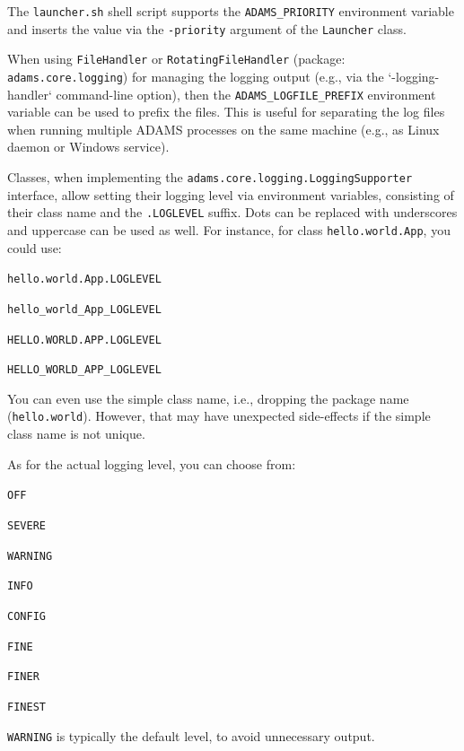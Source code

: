 \noindent The \texttt{launcher.sh} shell script supports the \texttt{ADAMS\_PRIORITY} environment variable and
inserts the value via the \texttt{-priority} argument of the \texttt{Launcher} class.

\noindent When using \texttt{FileHandler} or \texttt{RotatingFileHandler} (package: \texttt{adams.core.logging})
for managing the logging output (e.g., via the `-logging-handler` command-line option), then the
\texttt{ADAMS\_LOGFILE\_PREFIX} environment variable can be used to prefix the files. This is useful for separating
the log files when running multiple ADAMS processes on the same machine (e.g., as Linux daemon or Windows service).

Classes, when implementing the \texttt{adams.core.logging.LoggingSupporter} interface,
allow setting their logging level via environment variables, consisting of their class name and the
\texttt{.LOGLEVEL} suffix. Dots can be replaced with underscores and uppercase can be used as well.
For instance, for class \texttt{hello.world.App}, you could use:
\begin{tight_itemize}
    \item \texttt{hello.world.App.LOGLEVEL}
    \item \texttt{hello\_world\_App\_LOGLEVEL}
    \item \texttt{HELLO.WORLD.APP.LOGLEVEL}
    \item \texttt{HELLO\_WORLD\_APP\_LOGLEVEL}
\end{tight_itemize}
You can even use the simple class name, i.e., dropping the package name (\texttt{hello.world}). However,
that may have unexpected side-effects if the simple class name is not unique.

\noindent As for the actual logging level, you can choose from:
\begin{tight_itemize}
    \item \texttt{OFF}
    \item \texttt{SEVERE}
    \item \texttt{WARNING}
    \item \texttt{INFO}
    \item \texttt{CONFIG}
    \item \texttt{FINE}
    \item \texttt{FINER}
    \item \texttt{FINEST}
\end{tight_itemize}
\texttt{WARNING} is typically the default level, to avoid unnecessary output.

